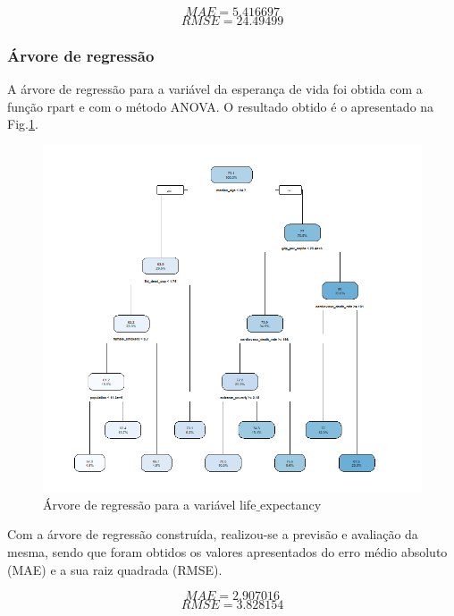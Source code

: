 \documentclass[conference]{IEEEtran}
\begin{document}
\begin{equation}
MAE=5.416697\label{4a_mae}
\end{equation}
\begin{equation}
RMSE=24.49499\label{4a_rmse}
\end{equation}


\subsubsection{Árvore de regressão}
A árvore de regressão para a variável da esperança de vida foi obtida com a função rpart e com o método ANOVA. O resultado obtido é o apresentado na Fig.\ref{4b}.

\begin{figure}[htbp]
\centerline{\includegraphics[width=0.95\columnwidth]{images/04_2.png}}
\caption{Árvore de regressão para a variável life$\_$expectancy}
\label{4b}
\end{figure}

Com a árvore de regressão construída, realizou-se a previsão e avaliação da mesma, sendo que foram obtidos os valores apresentados do erro médio absoluto (MAE) e a sua raiz quadrada (RMSE).

\begin{equation}
MAE=2.907016\label{4b_mae}
\end{equation}
\begin{equation}
RMSE=3.828154\label{4b_rmse}
\end{equation}
\end{document}
